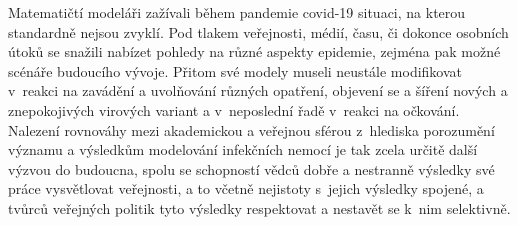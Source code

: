 Matematičtí modeláři zažívali během pandemie covid-19 situaci, na kterou standardně nejsou zvyklí. Pod tlakem veřejnosti, médií, času, či dokonce osobních útoků se snažili nabízet pohledy na různé aspekty epidemie, zejména pak možné scénáře budoucího vývoje. Přitom své modely museli neustále modifikovat v~reakci na zavádění a uvolňování různých opatření, objevení se a šíření nových a znepokojivých virových variant a v~neposlední řadě v~reakci na očkování. Nalezení rovnováhy mezi akademickou a veřejnou sférou z~hlediska porozumění významu a výsledkům modelování infekčních nemocí je tak zcela určitě další výzvou do budoucna, spolu se schopností vědců dobře a nestranně výsledky své práce vysvětlovat veřejnosti, a to včetně nejistoty s~jejich výsledky spojené, a tvůrců veřejných politik tyto výsledky respektovat a nestavět se k~nim selektivně.